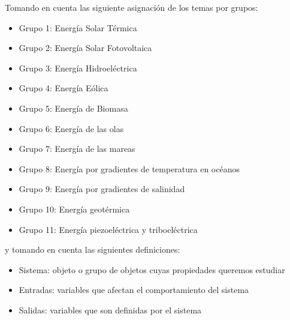\documentclass[12pt]{article}
\begin{document}


\noindent Tomando en cuenta las siguiente asignación de los temas por grupos:
\begin{itemize}
    \item Grupo 1: Energía Solar Térmica
    \item Grupo 2: Energía Solar Fotovoltaica
    \item Grupo 3: Energía Hidroeléctrica
    \item Grupo 4: Energía Eólica
    \item Grupo 5: Energía de Biomasa
    \item Grupo 6: Energía de las olas 
    \item Grupo 7: Energía de las mareas
    \item Grupo 8: Energía por gradientes de temperatura en océanos
    \item Grupo 9: Energía por gradientes de salinidad
    \item Grupo 10: Energía geotérmica
    \item Grupo 11: Energía piezoeléctrica y triboeléctrica
\end{itemize}
y tomando en cuenta las siguientes definiciones:
\begin{itemize}
    \item Sistema: objeto o grupo de objetos cuyas propiedades queremos estudiar
    \item Entradas: variables que afectan el comportamiento del sistema
    \item Salidas: variables que son definidas por el sistema
\end{itemize}
\end{document}
